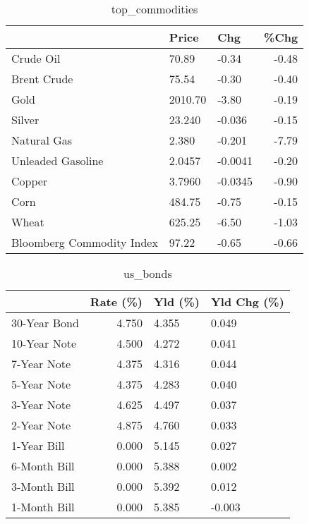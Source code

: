 \documentclass{article}%
\begin{document}
\begin{table}[htbp]%
\caption{top\_commodities}%
\centering%
\begin{adjustbox}{width=1\textwidth}%
\begin{tabular}{lllr}
\toprule
                          &   Price &     Chg &  \%Chg \\
\midrule
               Crude Oil  &   70.89 &   -0.34 & -0.48 \\
             Brent Crude  &   75.54 &   -0.30 & -0.40 \\
                    Gold  & 2010.70 &   -3.80 & -0.19 \\
                  Silver  &  23.240 &  -0.036 & -0.15 \\
             Natural Gas  &   2.380 &  -0.201 & -7.79 \\
       Unleaded Gasoline  &  2.0457 & -0.0041 & -0.20 \\
                  Copper  &  3.7960 & -0.0345 & -0.90 \\
                    Corn  &  484.75 &   -0.75 & -0.15 \\
                   Wheat  &  625.25 &   -6.50 & -1.03 \\
Bloomberg Commodity Index &   97.22 &   -0.65 & -0.66 \\
\bottomrule
\end{tabular}
%
\end{adjustbox}%
\end{table}

%


\begin{table}[htbp]%
\caption{us\_bonds}%
\centering%
\begin{adjustbox}{width=1\textwidth}%
\begin{tabular}{lrll}
\toprule
             &  Rate (\%) & Yld (\%) & Yld Chg (\%) \\
\midrule
30-Year Bond &     4.750 &   4.355 &       0.049 \\
10-Year Note &     4.500 &   4.272 &       0.041 \\
 7-Year Note &     4.375 &   4.316 &       0.044 \\
 5-Year Note &     4.375 &   4.283 &       0.040 \\
 3-Year Note &     4.625 &   4.497 &       0.037 \\
 2-Year Note &     4.875 &   4.760 &       0.033 \\
 1-Year Bill &     0.000 &   5.145 &       0.027 \\
6-Month Bill &     0.000 &   5.388 &       0.002 \\
3-Month Bill &     0.000 &   5.392 &       0.012 \\
1-Month Bill &     0.000 &   5.385 &      -0.003 \\
\bottomrule
\end{tabular}
%
\end{adjustbox}%
\end{table}
\end{document}
